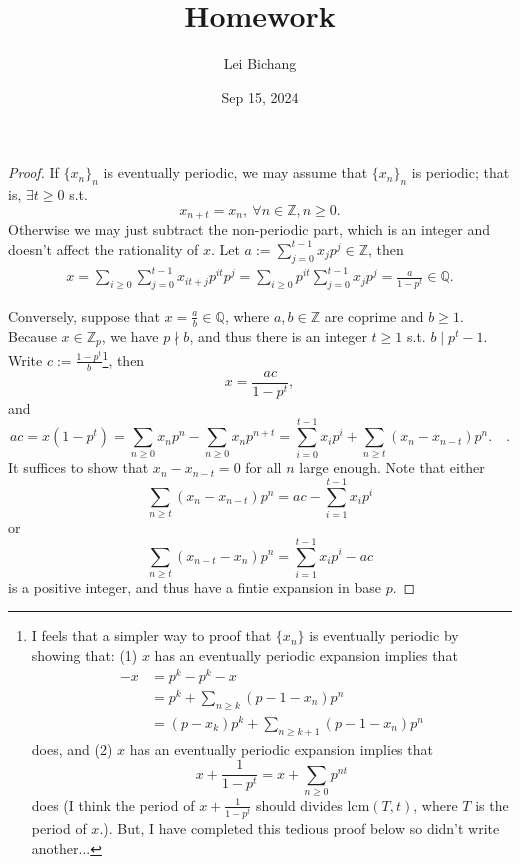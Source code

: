 \documentclass{article}
\title{Homework}
\author{Lei Bichang}
\date{Sep 15, 2024}
\theoremstyle{definition}
\theoremstyle{remark}
\newcommand{\Q}{\mathbb{Q}}
\newcommand{\Z}{\mathbb{Z}}
\begin{document}
\maketitle

\begin{proof}
If $\{x_n\}_n$ is eventually periodic, we may assume that $\{x_n\}_n$ is periodic; that is, $\exists t\ge 0$ s.t. \[x_{n + t} = x_n,\ \forall n\in\Z, n\ge 0.\]
Otherwise we may just subtract the non-periodic part, which is an integer and doesn't affect the rationality of $x$.
Let $a := \sum_{j=0}^{t-1}x_jp^j\in\Z$,
then \begin{align*}
    x = \sum_{i\ge 0}\sum_{j=0}^{t-1} x_{it+j}p^{it}p^j
    = \sum_{i\ge 0}p^{it}\sum_{j=0}^{t-1}x_jp^j 
    = \frac{a}{1-p^t}\in\Q.
\end{align*}

Conversely, suppose that $x = \frac{a}{b}\in\Q$, where $a, b\in\Z$ are coprime and $b\ge 1$.
Because $x\in\Z_p$, we have $p\nmid b$, and thus there is an integer $t\ge 1$ s.t. $b \mid p^t-1$.
Write $c := \frac{1-p^t}{b}$\footnote{I feels that a simpler way to proof that $\{x_n\}$ is eventually periodic by showing that:
(1) $x$ has an eventually periodic expansion implies that \begin{align*}
            -x &= p^k - p^k -x\\
            &= p^k + \sum_{n\ge k}(p-1 -x_n)p^n\\
            &= (p - x_k)p^k + \sum_{n\ge k + 1}(p - 1 - x_n)p^n
        \end{align*} does,
and (2) $x$ has an eventually periodic expansion implies that
\[x + \frac{1}{1-p^t} = x + \sum_{n\ge 0}p^{nt}\] does (I think the period of $x + \frac{1}{1-p^t}$ should divides $\mathrm{lcm} (T, t)$, where $T$ is the period of $x$.). But, I have completed this tedious proof below so didn't write another...},
then \[x = \frac{ac}{1-p^t},\]
and \[ac = x(1-p^t) = \sum_{n\ge 0}x_np^n - \sum_{n\ge 0}x_{n}p^{n+t} = \sum_{i=0}^{t-1}x_ip^i + \sum_{n\ge t}(x_n-x_{n-t})p^n.\quad.\]
It suffices to show that $x_n - x_{n-t} = 0$ for all $n$ large enough.
Note that either \[\sum_{n\ge t}(x_n-x_{n-t})p^n = ac - \sum_{i=1}^{t-1}x_ip^i\] or \[\sum_{n\ge t}(x_{n-t}-x_{n})p^n = \sum_{i=1}^{t-1}x_ip^i - ac\] is a positive integer, and thus have a fintie expansion in base $p$.



\end{proof}
\end{document}
